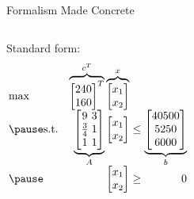 \documentclass{beamer}
\begin{document}
\begin{frame}{Formalism Made Concrete}
\begin{columns}
        \pause
        Standard form:
        \begin{equation*}
            \setlength\arraycolsep{1.5pt}
            \begin{array}{l@{\quad} r c r} 
                \max          & 
                \overbrace{\begin{bmatrix}
                    240 \\ 160
                \end{bmatrix}^{T}}^{c^T}
                \overbrace{\begin{bmatrix}
                    x_1 \\ x_2
                \end{bmatrix}}^{x} & & \\ \pause
                \mathrm{s.t.} &  
                \underbrace{\begin{bmatrix}
                    9 & 3 \\
                    \frac{3}{4} & 1 \\
                    1 & 1
                \end{bmatrix}}_{A}
                \begin{bmatrix}
                    x_1 \\ x_2
                \end{bmatrix} & \leq & 
                \underbrace{\begin{bmatrix}
                    40500 \\ 5250 \\ 6000
                \end{bmatrix}}_{b} \\ \pause
                              & 
                \begin{bmatrix}
                    x_1 \\ x_2
                \end{bmatrix} & \geq & 0 \\
            \end{array}
        \end{equation*}
    \end{columns}    
\end{frame}
\end{document}
